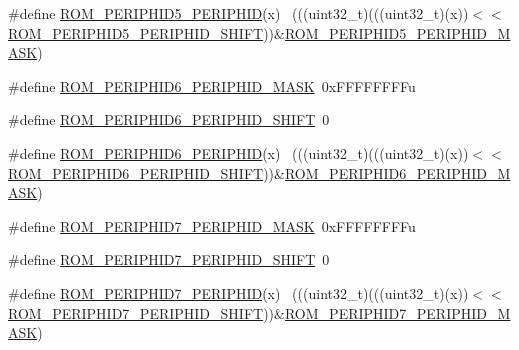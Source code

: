 \begin{DoxyCompactItemize}
\item 
\#define \hyperlink{group___r_o_m___register___masks_ga5ed700cba7d4cd040b3c61174f897600}{R\+O\+M\+\_\+\+P\+E\+R\+I\+P\+H\+I\+D5\+\_\+\+P\+E\+R\+I\+P\+H\+ID}(x)                            ~(((uint32\+\_\+t)(((uint32\+\_\+t)(x))$<$$<$\hyperlink{group___r_o_m___register___masks_ga083194b41cf1109fe5a6e235b2c1f89a}{R\+O\+M\+\_\+\+P\+E\+R\+I\+P\+H\+I\+D5\+\_\+\+P\+E\+R\+I\+P\+H\+I\+D\+\_\+\+S\+H\+I\+FT}))\&\hyperlink{group___r_o_m___register___masks_ga39e8a3441c79c42651efba9100e653a7}{R\+O\+M\+\_\+\+P\+E\+R\+I\+P\+H\+I\+D5\+\_\+\+P\+E\+R\+I\+P\+H\+I\+D\+\_\+\+M\+A\+SK})
\item 
\#define \hyperlink{group___r_o_m___register___masks_gae29765428defa80237980d34b67f4fde}{R\+O\+M\+\_\+\+P\+E\+R\+I\+P\+H\+I\+D6\+\_\+\+P\+E\+R\+I\+P\+H\+I\+D\+\_\+\+M\+A\+SK}~0x\+F\+F\+F\+F\+F\+F\+F\+Fu
\item 
\#define \hyperlink{group___r_o_m___register___masks_ga0cb9b85e1ca798d1897bcef6afce8a79}{R\+O\+M\+\_\+\+P\+E\+R\+I\+P\+H\+I\+D6\+\_\+\+P\+E\+R\+I\+P\+H\+I\+D\+\_\+\+S\+H\+I\+FT}~0
\item 
\#define \hyperlink{group___r_o_m___register___masks_ga61e6d41938290b1bc52272cb0c1b32a0}{R\+O\+M\+\_\+\+P\+E\+R\+I\+P\+H\+I\+D6\+\_\+\+P\+E\+R\+I\+P\+H\+ID}(x)                            ~(((uint32\+\_\+t)(((uint32\+\_\+t)(x))$<$$<$\hyperlink{group___r_o_m___register___masks_ga0cb9b85e1ca798d1897bcef6afce8a79}{R\+O\+M\+\_\+\+P\+E\+R\+I\+P\+H\+I\+D6\+\_\+\+P\+E\+R\+I\+P\+H\+I\+D\+\_\+\+S\+H\+I\+FT}))\&\hyperlink{group___r_o_m___register___masks_gae29765428defa80237980d34b67f4fde}{R\+O\+M\+\_\+\+P\+E\+R\+I\+P\+H\+I\+D6\+\_\+\+P\+E\+R\+I\+P\+H\+I\+D\+\_\+\+M\+A\+SK})
\item 
\#define \hyperlink{group___r_o_m___register___masks_ga46d62ff696136480044fa6bd78597be6}{R\+O\+M\+\_\+\+P\+E\+R\+I\+P\+H\+I\+D7\+\_\+\+P\+E\+R\+I\+P\+H\+I\+D\+\_\+\+M\+A\+SK}~0x\+F\+F\+F\+F\+F\+F\+F\+Fu
\item 
\#define \hyperlink{group___r_o_m___register___masks_ga660f3354bf252cb5c5a72b828ba683bd}{R\+O\+M\+\_\+\+P\+E\+R\+I\+P\+H\+I\+D7\+\_\+\+P\+E\+R\+I\+P\+H\+I\+D\+\_\+\+S\+H\+I\+FT}~0
\item 
\#define \hyperlink{group___r_o_m___register___masks_ga32542f8a2b9d9da78a36dd91c1d52faf}{R\+O\+M\+\_\+\+P\+E\+R\+I\+P\+H\+I\+D7\+\_\+\+P\+E\+R\+I\+P\+H\+ID}(x)                            ~(((uint32\+\_\+t)(((uint32\+\_\+t)(x))$<$$<$\hyperlink{group___r_o_m___register___masks_ga660f3354bf252cb5c5a72b828ba683bd}{R\+O\+M\+\_\+\+P\+E\+R\+I\+P\+H\+I\+D7\+\_\+\+P\+E\+R\+I\+P\+H\+I\+D\+\_\+\+S\+H\+I\+FT}))\&\hyperlink{group___r_o_m___register___masks_ga46d62ff696136480044fa6bd78597be6}{R\+O\+M\+\_\+\+P\+E\+R\+I\+P\+H\+I\+D7\+\_\+\+P\+E\+R\+I\+P\+H\+I\+D\+\_\+\+M\+A\+SK})
$$
\end{DoxyCompactItemize}
